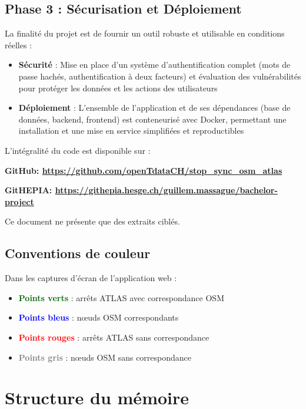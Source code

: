 \subsection*{Phase 3 : Sécurisation et Déploiement}
La finalité du projet est de fournir un outil robuste et utilisable en conditions réelles :
\begin{itemize}
    \item \textbf{Sécurité} : Mise en place d'un système d'authentification complet (mots de passe hachés, authentification à deux facteurs) et évaluation des vulnérabilités pour protéger les données et les actions des utilisateurs
    \item \textbf{Déploiement} : L'ensemble de l'application et de ses dépendances (base de données, backend, frontend) est conteneurisé avec Docker, permettant une installation et une mise en service simplifiées et reproductibles
\end{itemize}

L'intégralité du code est disponible sur :
\begin{center}
\textbf{GitHub: \href{https://github.com/openTdataCH/stop\_sync\_osm\_atlas}{https://github.com/openTdataCH/stop\_sync\_osm\_atlas}}

\textbf{GitHEPIA: \href{https://githepia.hesge.ch/guillem.massague/bachelor-project}{https://githepia.hesge.ch/guillem.massague/bachelor-project}}
\end{center}

Ce document ne présente que des extraits ciblés. 

\subsection*{Conventions de couleur}

Dans les captures d'écran de l'application web :
\begin{itemize}
   \item \textcolor{darkgreen}{\textbf{Points verts}} : arrêts ATLAS avec correspondance OSM
   \item \textcolor{blue}{\textbf{Points bleus}} : nœuds OSM correspondants
   \item \textcolor{red}{\textbf{Points rouges}} : arrêts ATLAS sans correspondance
   \item \textcolor{gray}{\textbf{Points gris}} : nœuds OSM sans correspondance
\end{itemize}

\section*{Structure du mémoire}

